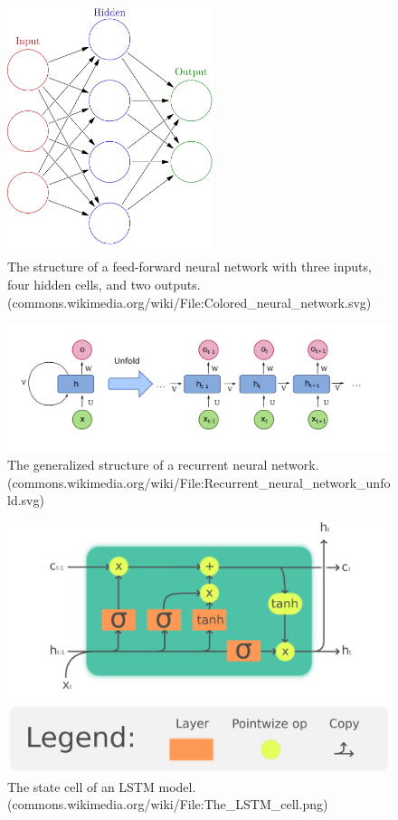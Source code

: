 \begin{figure}[p]
\includegraphics[width=6cm]{images/1000px-Colored_neural_network.png}
\centering
\caption{The structure of a feed-forward neural network with three inputs, four hidden cells, and two outputs. \\ (commons.wikimedia.org/wiki/File:Colored\_neural\_network.svg)}
\label{fig:NN}
\end{figure}

\begin{figure}[p]
\includegraphics[width=12cm]{images/RNN.png}
\centering
\caption{The generalized structure of a recurrent neural network. \\ (commons.wikimedia.org/wiki/File:Recurrent\_neural\_network\_unfold.svg)}
\label{fig:RNN}
\end{figure}

\begin{figure}[p]
\includegraphics[width=12cm]{images/The_LSTM_cell.png}
\centering
\caption{The state cell of an LSTM model. \\ (commons.wikimedia.org/wiki/File:The\_LSTM\_cell.png)}
\label{fig:LSTM}
\end{figure}

